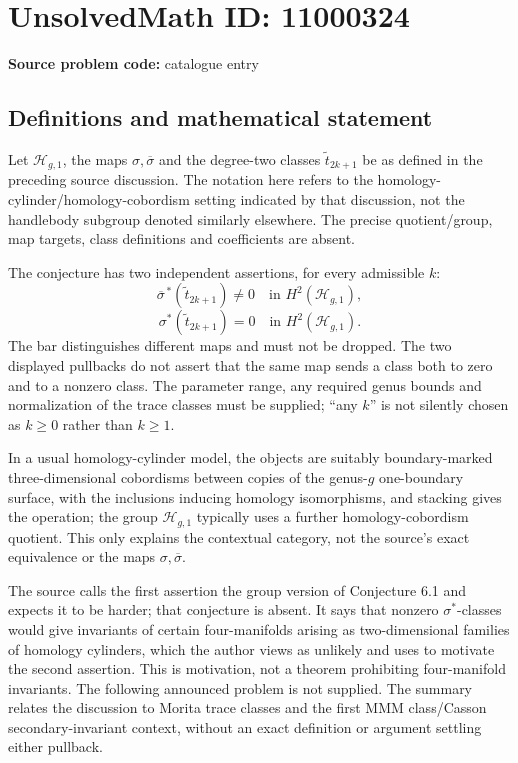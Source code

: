 \documentclass[11pt]{article}
\begin{document}
\section*{UnsolvedMath ID: 11000324}
\textbf{Source problem code:} catalogue entry
\subsection{Definitions and mathematical statement}
Let \(\mathcal H_{g,1}\), the maps \(\sigma,\overline\sigma\) and the degree-two classes \(\widetilde t_{2k+1}\) be as defined in the preceding source discussion. The notation here refers to the homology-cylinder/homology-cobordism setting indicated by that discussion, not the handlebody subgroup denoted similarly elsewhere. The precise quotient/group, map targets, class definitions and coefficients are absent.

The conjecture has two independent assertions, for every admissible \(k\):
\[\overline\sigma^{\,*}(\widetilde t_{2k+1})\ne0
\quad\text{in }H^2(\mathcal H_{g,1}),\]
\[\sigma^*(\widetilde t_{2k+1})=0
\quad\text{in }H^2(\mathcal H_{g,1}).\]
The bar distinguishes different maps and must not be dropped. The two displayed pullbacks do not assert that the same map sends a class both to zero and to a nonzero class. The parameter range, any required genus bounds and normalization of the trace classes must be supplied; ``any \(k\)'' is not silently chosen as \(k\geq0\) rather than \(k\geq1\).

In a usual homology-cylinder model, the objects are suitably boundary-marked three-dimensional cobordisms between copies of the genus-\(g\) one-boundary surface, with the inclusions inducing homology isomorphisms, and stacking gives the operation; the group \(\mathcal H_{g,1}\) typically uses a further homology-cobordism quotient. This only explains the contextual category, not the source's exact equivalence or the maps \(\sigma,\overline\sigma\).

The source calls the first assertion the group version of Conjecture 6.1 and expects it to be harder; that conjecture is absent. It says that nonzero \(\sigma^*\)-classes would give invariants of certain four-manifolds arising as two-dimensional families of homology cylinders, which the author views as unlikely and uses to motivate the second assertion. This is motivation, not a theorem prohibiting four-manifold invariants. The following announced problem is not supplied. The summary relates the discussion to Morita trace classes and the first MMM class/Casson secondary-invariant context, without an exact definition or argument settling either pullback.
\end{document}

